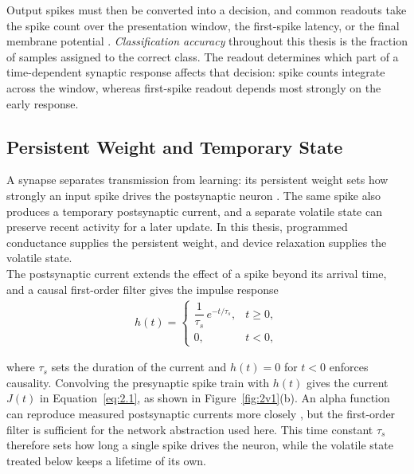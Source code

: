 \noindent Output spikes must then be converted into a decision, and common readouts take the spike count over the
presentation window, the first-spike latency, or the final membrane potential \cite{eshraghian2023training}.
\emph{Classification accuracy} throughout this thesis is the fraction of samples assigned to the correct class. The
readout determines which part of a time-dependent synaptic response affects that decision: spike counts integrate
across the window, whereas first-spike readout depends most strongly on the early response.

\subsection[Persistent Weight and Temporary State]{Persistent Weight and Temporary State}\label{subsec:plasticity}

\noindent A synapse separates transmission from learning: its persistent weight sets how strongly an input spike
drives the postsynaptic neuron \cite{bastos2022motor}. The same spike also produces a temporary postsynaptic current,
and a separate volatile state can preserve recent activity for a later update. In this thesis, programmed conductance
supplies the persistent weight, and device relaxation supplies the volatile state.\\

\noindent The postsynaptic current extends the effect of a spike beyond its arrival time, and a causal first-order
filter gives the impulse response
\begin{align}
    h(t) = \begin{cases}
    \dfrac{1}{\tau_s}\, e^{-t/\tau_s}, & t \ge 0, \\[4pt]
    0, & t < 0,
\end{cases} \label{eq:2.2}
\end{align}

\noindent where $\tau_s$ sets the duration of the current and $h(t)=0$ for $t<0$ enforces causality. Convolving the
presynaptic spike train with $h(t)$ gives the current $J(t)$ in Equation~\ref{eq:2.1}, as shown in
Figure~\ref{fig:2v1}(b). An alpha function can reproduce measured postsynaptic currents more closely
\cite{mainen1995reliability}, but the first-order filter is sufficient for the network abstraction used here. This
time constant $\tau_s$ therefore sets how long a single spike drives the neuron, while the volatile state treated
below keeps a lifetime of its own.\\

